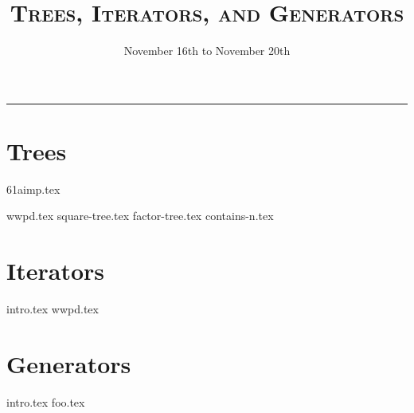 \documentclass{exam}
\title{\textsc{Trees, Iterators, and Generators}}
\date{November 16th to November 20th}
\begin{document}
\maketitle
\rule{\textwidth}{0.15em}
\fontsize{12}{15}\selectfont


\section{Trees}
{61aimp.tex}
\newpage

\begin{questions}
{wwpd.tex}
\newpage
{square-tree.tex}
\vspace{40}
{factor-tree.tex}
{contains-n.tex}
\newpage

\section{Iterators}
{intro.tex}
\newpage
{wwpd.tex}
\newpage
\section{Generators}
{intro.tex}
\newpage
{foo.tex}
\end{questions}
\end{document}
